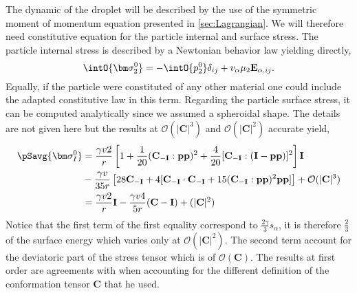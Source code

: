 The dynamic of the droplet will be described by the use of the symmetric moment of momentum equation presented in \ref{sec:Lagrangian}.
We will therefore need constitutive equation for the particle internal and surface stress. 
The particle internal stress is described by a Newtonian behavior law yielding directly, 
\begin{equation*}
    \intO{\bm\sigma_2^0}
    = - \intO{p_2^0} \delta_{ij}
    + v_\alpha \mu_2 \textbf{E}_{\alpha,ij}.
\end{equation*} 
Equally, if the particle were constituted of any other material one could include the adapted constitutive law in this term. 
Regarding the particle surface stress, it can be computed analytically since we assumed a spheroidal shape. 
The details are not given here but the results at $\mathcal{O}(|\textbf{C}|^3)$  and $\mathcal{O}(|\textbf{C}|^2)$ accurate yield, 
\begin{align*}
    \pSavg{\bm\sigma_I^0}
    &= \frac{\gamma v 2}{r} \left[
        1  + \frac{1}{20 } (\textbf{C}_{-\textbf{I}}:\textbf{pp})^2 
        + \frac{4}{20 } [\textbf{C}_{-\textbf{I}}:(\textbf{I}-\textbf{pp})]^2\right] \textbf{I}\\
        &- \frac{\gamma v}{35 r} \left[ 28 \textbf{C}_{-\textbf{I}}
        + 4[\textbf{C}_{-\textbf{I}}\cdot \textbf{C}_{-\textbf{I}} + 15 (\textbf{C}_{-\textbf{I}}:\textbf{pp})^2\textbf{pp}]
        \right]
        +\mathcal{O}(|\textbf{C}|^3)\\
    &= \frac{\gamma v 2}{r} \textbf{I} - \frac{\gamma v 4}{5 r} (\textbf{C} - \textbf{I})
    +\mathcal(|\textbf{C}|^2)
\end{align*}
Notice that the first term of the first equality correspond to $\frac{2\gamma}{3}s_\alpha$, it is therefore $\frac{2}{3}$ of the surface energy which varies only at $\mathcal{O}(|\textbf{C}|^2)$. 
The second term account for the deviatoric part of the stress tensor which is of $\mathcal{O}(\textbf{C})$. 
The results at first order are agreements with \citet{lhuillier1987phenomenology} when accounting for the different definition of the conformation tensor \textbf{C} that he used.


